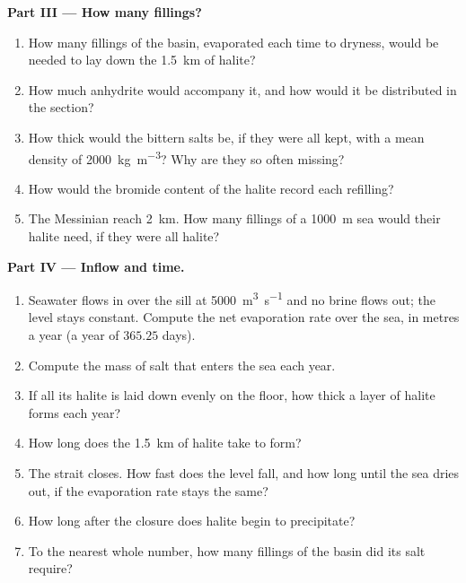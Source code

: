 \begin{problem}
\noindent\textbf{Part III --- How many fillings?}
\begin{enumerate}[resume]
  \item How many fillings of the basin, evaporated each time to dryness, would
        be needed to lay down the \qty{1.5}{km} of halite?
  \item How much anhydrite would accompany it, and how would it be
        distributed in the section?
  \item How thick would the bittern salts be, if they were all kept, with a
        mean density of \qty{2000}{kg.m^{-3}}? Why are they so often missing?
  \item How would the bromide content of the halite record each refilling?
  \item The Messinian  reach \qty{2}{km}. How many fillings of a
        \qty{1000}{m} sea would their halite need, if they were all halite?
\end{enumerate}

\noindent\textbf{Part IV --- Inflow and time.}
\begin{enumerate}[resume]
  \item Seawater flows in over the sill at \qty{5000}{m^3.s^{-1}} and no brine
        flows out; the level stays constant. Compute the net evaporation rate
        over the sea, in metres a year (a year of $365.25$ days).
  \item Compute the mass of salt that enters the sea each year.
  \item If all its halite is laid down evenly on the floor, how thick a layer
        of halite forms each year?
  \item How long does the \qty{1.5}{km} of halite take to form?
  \item The strait closes. How fast does the level fall, and how long until the
        sea dries out, if the evaporation rate stays the same?
  \item How long after the closure does halite begin to precipitate?
  \item To the nearest whole number, how many fillings of the basin did its
        salt require?
\end{enumerate}
\end{problem}

